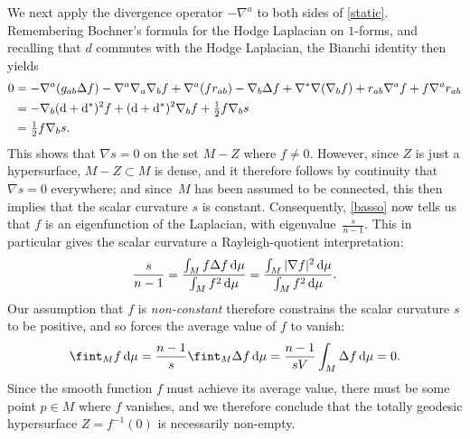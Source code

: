 \documentclass[pdftex]{sigma}
\numberwithin{equation}{section}
\begin{document}
We next apply the divergence operator $-\nabla^a$ to both sides of \eqref{static}. Remembering Bochner's formula for the Hodge Laplacian on $1$-forms, and recalling that $d$ commutes with the Hodge Laplacian, the Bianchi identity then yields
\begin{align*}
0&= -\nabla^a (g_{ab}\Delta f) - \nabla^a\nabla_a \nabla_b f + \nabla^a(fr_{ab})
 -\nabla_b \Delta f + \nabla^*\nabla (\nabla_b f )+ r_{ab}\nabla^af + f\nabla^ar_{ab}
\\&=-\nabla_b ({\rm d}+{\rm d}^*)^2 f + ({\rm d}+{\rm d}^*)^2 \nabla_b f+ \tfrac{1}{2} f\nabla_b s
\\&= \tfrac{1}{2} f\nabla_b s .
\end{align*}
This shows that $\nabla s=0$ on the set $M-Z$ where $f \neq 0$. However, since $Z$ is just a hypersurface,
$M-Z\subset M$ is dense, and it therefore follows by continuity that $\nabla s=0$ everywhere; and since~$M$ has been assumed to be connected, this then implies that the scalar curvature $s$ is constant.
Consequently, \eqref{basso} now tells us that $f$ is an eigenfunction of the Laplacian, with eigenvalue~$\frac{s}{n-1}$.
This in particular gives the scalar curvature a Rayleigh-quotient interpretation:
\begin{equation*}
\frac{s}{n-1} = \frac{\int_M f\Delta f\, {\rm d}\mu}{ \int_M f^2\, {\rm d}\mu} = \frac{\int_M|\nabla f|^2\, {\rm d}\mu}{ \int_M f^2\, {\rm d}\mu}.
\end{equation*}
Our assumption that $f$ is {\em non-constant} therefore constrains the scalar curvature $s$ to be {positive},
and so forces the average value of $f$ to vanish:
\begin{equation*}
\fint_M f\, {\rm d}\mu = \frac{n-1}{s}\fint_M \Delta f\, {\rm d}\mu = \frac{n-1}{sV}\int_M \Delta f\, {\rm d}\mu =0.
\end{equation*}
Since the smooth function $f$ must achieve its average value, there must be some point $p\in M$ where $f$ vanishes, and we
therefore conclude that
 the totally geodesic hypersurface $Z= f^{-1}(0)$ is necessarily non-empty.
\end{document}
